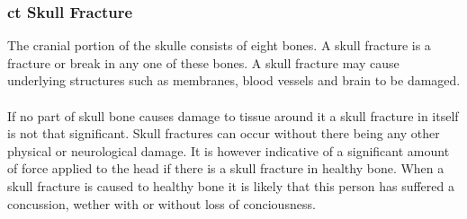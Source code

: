 \documentclass[11pt]{article}
\begin{document}
\subsubsection{\gls{ct} Skull Fracture}
The cranial portion of the skulle consists of eight bones. A skull fracture is a fracture or break in any one of these bones. A skull fracture may cause underlying structures such as membranes, blood vessels and brain to be damaged.\cite{SkullFracture2020}\\
\\
If no part of skull bone causes damage to tissue around it a skull fracture in itself is not that significant. Skull fractures can occur without there being any other physical or neurological damage. It is however indicative of a significant amount of force applied to the head if there is a skull fracture in healthy bone. When a skull fracture is caused to healthy bone it is likely that this person has suffered a concussion, wether with or without loss of conciousness.\cite{SkullFracture2020}
\end{document}
